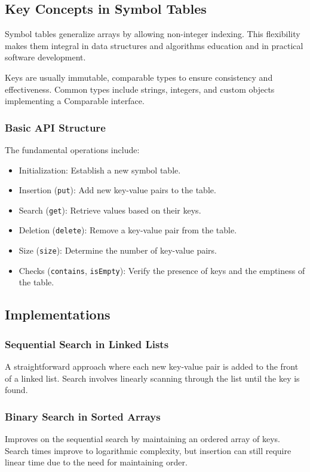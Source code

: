 \documentclass{article}
\begin{document}
\subsection{Key Concepts in Symbol Tables} 

Symbol tables generalize arrays by allowing non-integer indexing. This flexibility makes them integral in data structures and algorithms education and in practical software development.

Keys are usually immutable, comparable types to ensure consistency and effectiveness. Common types include strings, integers, and custom objects implementing a Comparable interface.

\subsubsection{Basic API Structure}
The fundamental operations include:
\begin{itemize}
    \item Initialization: Establish a new symbol table.
    \item Insertion (\texttt{put}): Add new key-value pairs to the table.
    \item Search (\texttt{get}): Retrieve values based on their keys.
    \item Deletion (\texttt{delete}): Remove a key-value pair from the table.
    \item Size (\texttt{size}): Determine the number of key-value pairs.
    \item Checks (\texttt{contains}, \texttt{isEmpty}): Verify the presence of keys and the emptiness of the table.
\end{itemize}

\subsection{Implementations}
\subsubsection{Sequential Search in Linked Lists}
A straightforward approach where each new key-value pair is added to the front of a linked list. Search involves linearly scanning through the list until the key is found.

\subsubsection{Binary Search in Sorted Arrays}
Improves on the sequential search by maintaining an ordered array of keys. Search times improve to logarithmic complexity, but insertion can still require linear time due to the need for maintaining order.
\end{document}
